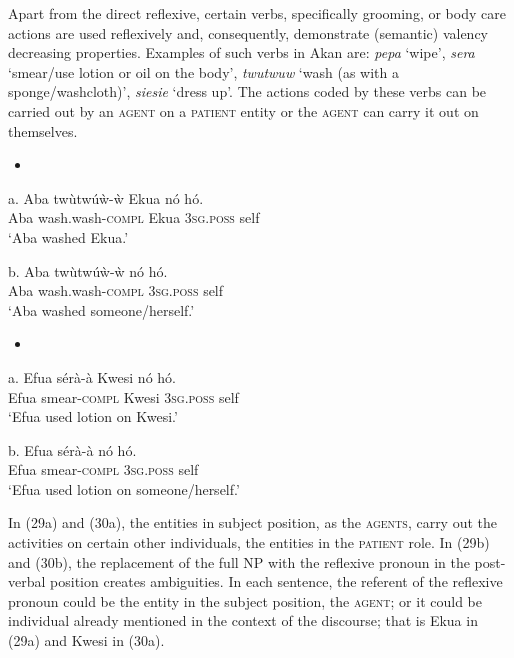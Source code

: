 \documentclass[output=paper]{langsci/langscibook}
\begin{document}
Apart from the direct reflexive, certain verbs, specifically grooming, or body care actions \citep{Kemmer1993} are used reflexively and, consequently, demonstrate (semantic) valency decreasing properties. Examples of such verbs in Akan are: \emph{pepa} ‘wipe’, \emph{sera} ‘smear/use lotion or oil on the body’, \emph{twutwuw} ‘wash (as with a sponge/washcloth)’, \emph{siesie} ‘dress up’. The actions coded by these verbs can be carried out by an \textsc{agent} on a \textsc{patient} entity or the \textsc{agent} can carry it out on themselves. 

\begin{itemize}
\item \end{itemize}
\gll a.  Aba  tw\`{u}tw\'{u}\`{w}-\`{w}    Ekua  n\'{o}    h\'{o}.\\
       Aba  wash.wash-\textsc{compl}  Ekua  \textsc{3sg.poss}  self\\
\glt   ‘Aba washed Ekua.’
\z

\gll  b.  Aba  tw\`{u}tw\'{u}\`{w}-\`{w}    n\'{o}    h\'{o}.\\
       Aba  wash.wash-\textsc{compl}  \textsc{3sg.poss}  self\\
\glt   ‘Aba washed someone/herself.’
\z

\begin{itemize}
\item \end{itemize}
\gll a.  Efua  s\'{e}r\`{a}-\`{a}    Kwesi    n\'{o}    h\'{o}.\\
       Efua  smear-\textsc{compl}  Kwesi    \textsc{3sg.poss}  self\\
\glt   ‘Efua used lotion on Kwesi.’
\z

\gll  b.  Efua  s\'{e}r\`{a}-\`{a}    n\'{o}    h\'{o}.\\
       Efua  smear-\textsc{compl}  \textsc{3sg.poss}  self\\
\glt   ‘Efua used lotion on someone/herself.’
\z

In (29a) and (30a), the entities in subject position, as the \textsc{agents}, carry out the activities on certain other individuals, the entities in the \textsc{patient} role. In (29b) and (30b), the replacement of the full NP with the reflexive pronoun in the post-verbal position creates ambiguities. In each sentence, the referent of the reflexive pronoun could be the entity in the subject position, the \textsc{agent}; or it could be individual already mentioned in the context of the discourse; that is Ekua in (29a) and Kwesi in (30a).
\end{document}

